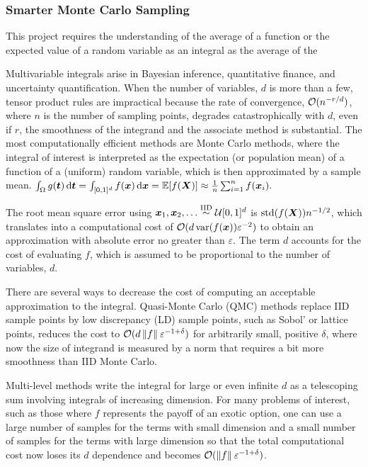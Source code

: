 \subsubsection{Smarter Monte Carlo Sampling}
This project requires the understanding of the average of a function or the expected value of a random variable as an integral as the average of the 

Multivariable integrals arise in Bayesian inference, quantitative finance, and uncertainty quantification.  When the number of variables, $d$ is more than a few, tensor product rules are impractical because the rate of convergence, $\mathcal{O}(n^{-r/d})$, where $n$ is the number of sampling points, degrades catastrophically with $d$, even if $r$, the smoothness of the integrand and the associate method is substantial.  The most computationally efficient methods are Monte Carlo methods, where the integral of interest is interpreted as the expectation (or population mean) of a function of a (uniform) random variable, which is then approximated by a sample mean.
$
    \int_{\Omega} g({\boldsymbol{t}}) \, \textup{d} {\boldsymbol{t}} = \int_{[0,1]^d} f({\boldsymbol{x}}) \, \textup{d} {\boldsymbol{x}} = \mathbb{E}[f({\boldsymbol{X}})] \approx \frac 1n \sum_{i=1}^n f({\boldsymbol{x}}_i).
$

The root mean square error using ${\boldsymbol{x}}_1, {\boldsymbol{x}}_2, \ldots \overset{\text{IID}}{\sim} {\mathcal{U}}[0,1]^d$ is $\operatorname{std}(f({\boldsymbol{X}})) n^{-1/2}$, which translates into a computational cost of $\mathcal{O}(d\operatorname{var}(f({\boldsymbol{x}}))\varepsilon^{-2})$ to obtain an approximation with absolute error no greater than $\varepsilon$. The term $d$ accounts for the cost of evaluating $f$, which is assumed to be proportional to the number of variables, $d$.

There are several ways to decrease the cost of computing an acceptable approximation to the integral.  Quasi-Monte Carlo (QMC) methods \cite{DicEtal14a} replace IID sample points by low discrepancy (LD) sample points, such as Sobol' or lattice points, reduces the cost to $\mathcal{O}(d\left \lVert f \right \rVert_{{}}\varepsilon^{-1+\delta})$ for arbitrarily small, positive $\delta$, where now the size of integrand is measured by a norm that requires a bit more smoothness than IID Monte Carlo. 

Multi-level methods write the integral for large or even infinite $d$ as a telescoping sum involving integrals of increasing dimension. 
For many problems of interest, such as those where $f$ represents the payoff of an exotic option, one can use a large number of samples for the terms with small dimension and a small number of samples for the terms with large dimension so that the total computational cost now loses its $d$ dependence and becomes $\mathcal{O}(\left \lVert f \right \rVert_{{}}\varepsilon^{-1+\delta})$.
 
